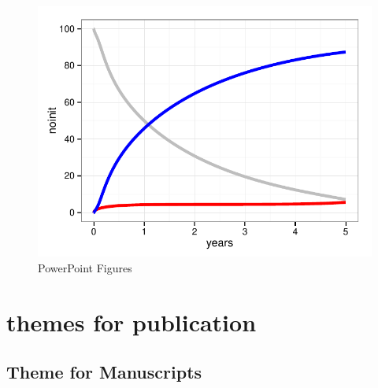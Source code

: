 \documentclass[nojss]{jss}\usepackage[]{graphicx}\usepackage[]{color}
\makeatletter
\def\maxwidth{ %
  \ifdim\Gin@nat@width>\linewidth
    \linewidth
  \else
    \Gin@nat@width
  \fi
}
\newenvironment{knitrout}{}{} %
\makeatother
\begin{document}
\begin{knitrout}
\begin{figure}[htpb]
{\centering \includegraphics[width=\maxwidth]{figure/beamer-powerpoint} 

}

\caption[PowerPoint Figures]{PowerPoint Figures\label{F:powerpoint}}
\end{figure}


\end{knitrout}


\section[Themes for publications]{ themes for publication}\label{S:themes}

\subsection{Theme for Manuscripts}
\end{document}
